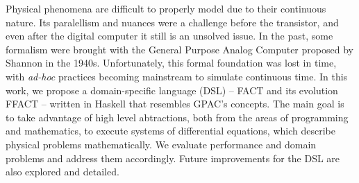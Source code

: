 
Physical phenomena are difficult to properly model due to their continuous nature. Its paralellism and nuances were a challenge before the transistor, and even after the digital computer it still is an unsolved issue. In the past, some formalism were brought with the General Purpose Analog Computer proposed by Shannon in the 1940s. Unfortunately, this formal foundation was lost in time, with \textit{ad-hoc} practices becoming mainstream to simulate continuous time. In this work, we propose a domain-specific language (DSL) -- FACT and its evolution FFACT -- written in Haskell that resembles GPAC's concepts. The main goal is to take advantage of high level abtractions, both from the areas of programming and mathematics, to execute systems of differential equations, which describe physical problems mathematically. We evaluate performance and domain problems and address them accordingly. Future improvements for the DSL are also explored and detailed.
